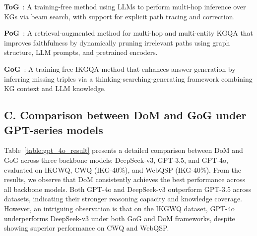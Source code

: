 
\textbf{ToG}~\cite{sun2023think}: A training-free method using LLMs to perform multi-hop inference over KGs via beam search, with support for explicit path tracing and correction.


\textbf{PoG}~\cite{tan2025paths}: A retrieval-augmented method for multi-hop and multi-entity KGQA that improves faithfulness by dynamically pruning irrelevant paths using graph structure, LLM prompts, and pretrained encoders.


\textbf{GoG}~\cite{xu2024generate}: A training-free IKGQA method that enhances answer generation by inferring missing triples via a thinking-searching-generating framework combining KG context and LLM knowledge.

\subsection{C. Comparison between DoM and GoG under GPT-series models}



Table~\ref{table:gpt_4o_result} presents a detailed comparison between DoM and GoG across three backbone models: DeepSeek-v3, GPT-3.5, and GPT-4o, evaluated on IKGWQ, CWQ (IKG-40\%), and WebQSP (IKG-40\%). From the results, we observe that DoM consistently achieves the best performance across all backbone models. Both GPT-4o and DeepSeek-v3 outperform GPT-3.5 across datasets, indicating their stronger reasoning capacity and knowledge coverage. However, an intriguing observation is that on the IKGWQ dataset, GPT-4o underperforms DeepSeek-v3 under both GoG and DoM frameworks, despite showing superior performance on CWQ and WebQSP. 

